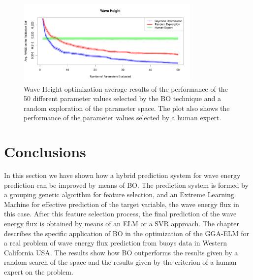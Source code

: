 \begin{figure}[!htb]
\centering
\includegraphics[width=0.8\textwidth]{Figures/alcala/bo_height.pdf}
\caption{\label{bo:hexperiments}
        Wave Height optimization average results of the performance of the 50 different parameter values
        selected by the BO technique and a random exploration of the parameter space.
        The plot also shows the performance of the parameter values selected by a human expert.
}
\end{figure}

\section{Conclusions}\label{sec:Conclusions}
In this section we have shown how a hybrid prediction system for wave energy prediction can be improved by means of BO. The prediction system is formed by a grouping genetic algorithm for feature selection, and an Extreme Learning Machine for effective prediction of the target variable, the wave energy flux in this case. After this feature selection process, the final prediction of the wave energy flux is obtained by means of an ELM or a SVR approach.
The chapter describes the specific application of BO in the optimization of the GGA-ELM for a real problem of wave energy flux prediction from buoys data in Western California USA. The results show how BO outperforms the results given by a random search of the space and the results given by the criterion of a human expert on the problem. 
